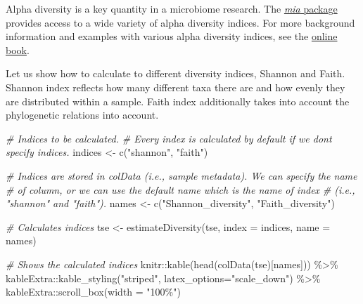 \documentclass[
  oneside]{book}
\newenvironment{Shaded}{\begin{snugshade}}{\end{snugshade}}
\newcommand{\AttributeTok}[1]{\textcolor[rgb]{0.77,0.63,0.00}{#1}}
\newcommand{\CommentTok}[1]{\textcolor[rgb]{0.56,0.35,0.01}{\textit{#1}}}
\newcommand{\FunctionTok}[1]{\textcolor[rgb]{0.00,0.00,0.00}{#1}}
\newcommand{\NormalTok}[1]{#1}
\newcommand{\OtherTok}[1]{\textcolor[rgb]{0.56,0.35,0.01}{#1}}
\newcommand{\SpecialCharTok}[1]{\textcolor[rgb]{0.00,0.00,0.00}{#1}}
\newcommand{\StringTok}[1]{\textcolor[rgb]{0.31,0.60,0.02}{#1}}
\begin{document}
Alpha diversity is a key quantity in a microbiome research. The \href{https://microbiome.github.io/mia/}{\emph{mia}
package} provides access to a wide
variety of alpha diversity indices. For more background information
and examples with various alpha diversity indices, see the \href{https://microbiome.github.io/OMA/microbiome-diversity.html\#alpha-diversity}{online
book}.

Let us show how to calculate to different diversity indices, Shannon
and Faith. Shannon index reflects how many different taxa there are
and how evenly they are distributed within a sample. Faith index
additionally takes into account the phylogenetic relations into
account.

\begin{Shaded}
\begin{Highlighting}[]
\CommentTok{\# Indices to be calculated. }
\CommentTok{\# Every index is calculated by default if we don\textquotesingle{}t specify indices.}
\NormalTok{indices }\OtherTok{\textless{}{-}} \FunctionTok{c}\NormalTok{(}\StringTok{"shannon"}\NormalTok{, }\StringTok{"faith"}\NormalTok{)}

\CommentTok{\# Indices are stored in colData (i.e., sample metadata). We can specify the name}
\CommentTok{\# of column, or we can use the default name which is the name of index }
\CommentTok{\# (i.e., "shannon" and "faith"). }
\NormalTok{names }\OtherTok{\textless{}{-}} \FunctionTok{c}\NormalTok{(}\StringTok{"Shannon\_diversity"}\NormalTok{, }\StringTok{"Faith\_diversity"}\NormalTok{)}

\CommentTok{\# Calculates indices}
\NormalTok{tse }\OtherTok{\textless{}{-}} \FunctionTok{estimateDiversity}\NormalTok{(tse, }\AttributeTok{index =}\NormalTok{ indices, }\AttributeTok{name =}\NormalTok{ names)}

\CommentTok{\# Shows the calculated indices}
\NormalTok{knitr}\SpecialCharTok{::}\FunctionTok{kable}\NormalTok{(}\FunctionTok{head}\NormalTok{(}\FunctionTok{colData}\NormalTok{(tse)[names])) }\SpecialCharTok{\%\textgreater{}\%} 
\NormalTok{  kableExtra}\SpecialCharTok{::}\FunctionTok{kable\_styling}\NormalTok{(}\StringTok{"striped"}\NormalTok{, }
                            \AttributeTok{latex\_options=}\StringTok{"scale\_down"}\NormalTok{) }\SpecialCharTok{\%\textgreater{}\%} 
\NormalTok{  kableExtra}\SpecialCharTok{::}\FunctionTok{scroll\_box}\NormalTok{(}\AttributeTok{width =} \StringTok{"100\%"}\NormalTok{)}
\end{Highlighting}
\end{Shaded}
\end{document}

